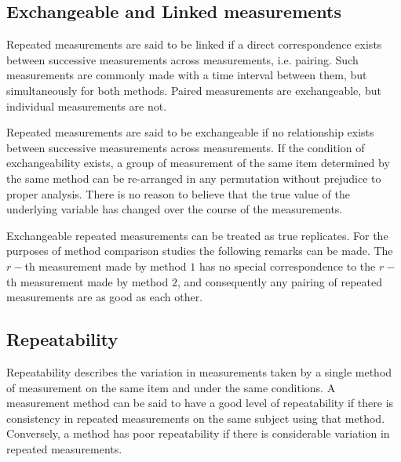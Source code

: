 \documentclass[12pt, a4paper]{report}
\theoremstyle{plain}
\theoremstyle{definition}
\theoremstyle{remark}
\begin{document}
	\subsection{Exchangeable and Linked measurements}
	
	Repeated measurements are said to be linked if a direct correspondence exists between successive measurements across measurements, i.e. pairing. Such measurements are commonly made with a time interval between them, but simultaneously for both methods. Paired measurements are exchangeable, but individual measurements are not.
	
	Repeated measurements are said to be exchangeable if no relationship exists between successive measurements across measurements. If the condition of exchangeability exists, a group of measurement of the same item determined by the same method can be re-arranged in any permutation without prejudice to proper analysis. There is no reason to believe that the true value of the underlying variable has changed over the course of the measurements.
	
	Exchangeable repeated measurements can be treated as true replicates. For the purposes of method comparison studies the following remarks can be made. The $r-$th measurement made by method $1$ has no special correspondence to the $r-$th measurement made by method $2$, and consequently any pairing of repeated measurements are as good as each other.
	
	

	
		
	
	
	
	
	

	
	
	
	\subsection{Repeatability}
	Repeatability describes the variation in measurements taken by a single method of measurement on the same item and under the same conditions. A measurement method can be said to have a good level of repeatability if there is consistency in repeated measurements on the same subject using that method. Conversely, a method has poor repeatability if there is considerable variation in repeated measurements.
		
\end{document}

